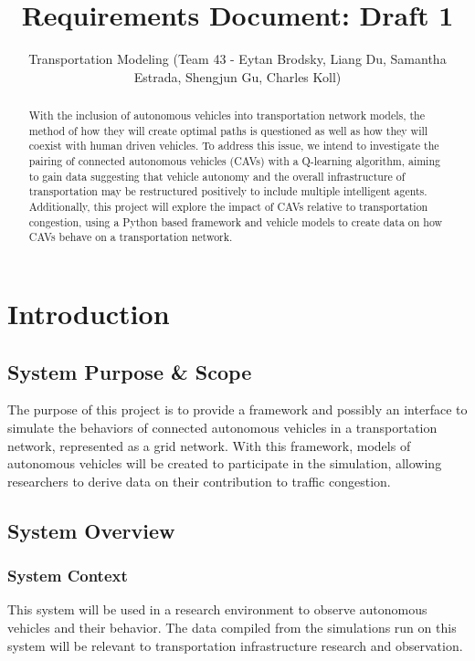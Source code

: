 \documentclass[10pt,letterpaper,draftclsnofoot,onecolumn]{IEEEtran}
\begin{document}
\author{Transportation Modeling (Team 43 - Eytan Brodsky, Liang Du, Samantha Estrada, Shengjun Gu, Charles Koll)}
\title{Requirements Document: Draft 1}

\maketitle

\begin{abstract}
With the inclusion of autonomous vehicles into transportation network models, the method of how they will create optimal paths is questioned as well as how they will coexist with human driven vehicles. To address this issue, we intend to investigate the pairing of connected autonomous vehicles (CAVs) with a Q-learning algorithm, aiming to gain data suggesting that vehicle autonomy and the overall infrastructure of transportation may be restructured positively to include multiple intelligent agents. Additionally, this project will explore the impact of CAVs relative to transportation congestion, using a Python based framework and vehicle models to create data on how CAVs behave on a transportation network.
\end{abstract}

\pagebreak

\section{Introduction}
	\subsection{System Purpose \& Scope}
	The purpose of this project is to provide a framework and possibly an interface to simulate the behaviors of connected autonomous vehicles in a transportation network, represented as a grid network. With this framework, models of autonomous vehicles will be created to participate in the simulation, allowing researchers to derive data on their contribution to traffic congestion.
	\subsection{System Overview}
		\subsubsection{System Context}
		This system will be used in a research environment to observe autonomous vehicles and their behavior. The data compiled from the simulations run on this system will be relevant to transportation infrastructure research and observation.
\end{document}
